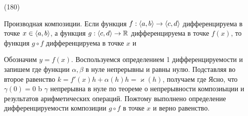 (180)

\T \q Производная композиции. Если функция $f: \langle a, b \rangle \to \langle c, d \rangle$ дифференцируема в точке $x \in \langle a, b \rangle$, а функция $g: \langle c, d \rangle \to \mathbb{R}$ дифференцируема в точке $f(x)$, то функция $g \circ f$ дифференцируема в точке $x$ и 

\D Обозначим $y = f(x)$. Воспользуемся определением 1 дифференцируемости и запишем   где функции $\alpha, \beta$ в нуле непрерывны и равны нулю. Подставляя во второе равенство $k = f'(x)h + \alpha(h)h = \varkappa(h)$, получаем
 где  Ясно, что $\gamma(0) = 0$ b $\gamma$ непрерывна в нуле по теореме о непрерывности композиыции и результатов арифметических операций. Пожтому выполнено определение дифференцируемости композиции $g\circ f$ в точке $x$ и верно равенство.